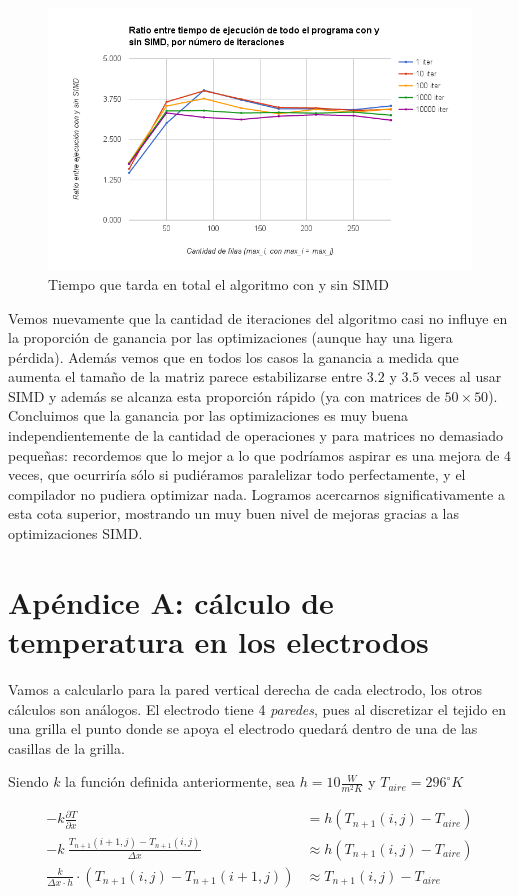 \documentclass[a4paper]{article}
\begin{document}
\begin{figure}[!htbp]
  \centering
	\includegraphics[width=.6\linewidth]{images/RatioAll.png}
  \caption{Tiempo que tarda en total el algoritmo con y sin SIMD}
	\label{fig:RatioAll}
\end{figure}

Vemos nuevamente que la cantidad de iteraciones del algoritmo casi 
no influye en la proporción de ganancia por las optimizaciones 
(aunque hay una ligera pérdida). Además vemos que en todos los casos 
la ganancia a medida que aumenta el tamaño de la matriz parece 
estabilizarse entre $3.2$ y $3.5$ veces al usar SIMD y además 
se alcanza esta proporción rápido (ya con matrices de $50 \times 50$).\\
Concluimos que la ganancia por las optimizaciones es muy buena 
independientemente de la cantidad de operaciones y para matrices 
no demasiado pequeñas: recordemos que lo mejor a lo que podríamos aspirar
es una mejora de $4$ veces, que ocurriría sólo si pudiéramos paralelizar
todo perfectamente, y el compilador no pudiera optimizar nada. Logramos
acercarnos significativamente a esta cota superior, mostrando un muy buen
nivel de mejoras gracias a las optimizaciones SIMD.

\newpage
\section{Apéndice A: cálculo de temperatura en los electrodos}

Vamos a calcularlo para la pared vertical derecha de cada electrodo, los otros cálculos son análogos. El electrodo tiene 4 \textit{paredes}, pues al discretizar el tejido en una grilla el punto donde se apoya el electrodo quedará dentro de una de las casillas de la grilla.

Siendo $k$ la función definida anteriormente, sea $h = 10 \frac{W}{m^2 K}$ y $T_{aire} = 296 ^\circ K$

\begin{equation*}
\begin{aligned}
-k \frac{\partial T}{\partial x} & = h (T_{n+1}(i,j) -  T_{aire}) \\
-k \ \frac{T_{n+1}(i+1,j) - T_{n+1}(i,j)}{\Delta x} & \approx h (T_{n+1}(i,j) -  T_{aire}) \\
\frac{k}{\Delta x \cdot h} \cdot (T_{n+1}(i,j) - T_{n+1}(i+1,j)) & \approx T_{n+1}(i,j) -  T_{aire}
\end{aligned}
\end{equation*}
\end{document}
